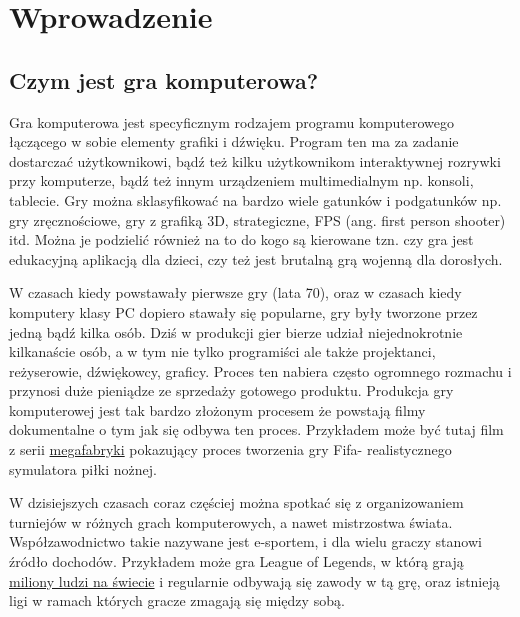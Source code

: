 \setcounter{secnumdepth}{3}
\renewcommand{\chaptername}{Rozdział}
\chapter{Wprowadzenie} 

\section{Czym jest gra komputerowa?}
\hspace{1cm} Gra komputerowa jest specyficznym rodzajem programu komputerowego łączącego w sobie elementy grafiki i dźwięku. Program ten ma za zadanie dostarczać użytkownikowi, bądź też kilku użytkownikom interaktywnej rozrywki przy komputerze, bądź też innym urządzeniem multimedialnym np. konsoli, tablecie. Gry można sklasyfikować na bardzo wiele gatunków i podgatunków np. gry zręcznościowe, gry z grafiką 3D, strategiczne, FPS (ang. first person shooter) itd. Można je podzielić również na to do kogo są kierowane tzn. czy gra jest edukacyjną aplikacją dla dzieci, czy też jest brutalną grą wojenną dla dorosłych.

W czasach kiedy powstawały pierwsze gry (lata 70), oraz w czasach kiedy komputery klasy PC dopiero stawały się popularne, gry były tworzone przez jedną bądź kilka osób. Dziś w produkcji gier bierze udział niejednokrotnie kilkanaście osób, a w tym nie tylko programiści ale także projektanci, reżyserowie, dźwiękowcy, graficy. 
Proces ten nabiera często ogromnego rozmachu i przynosi duże pieniądze ze sprzedaży gotowego produktu. Produkcja gry komputerowej jest tak bardzo złożonym procesem że powstają filmy dokumentalne o tym jak się odbywa ten proces. Przykładem może być tutaj film z serii \href{http://natgeotv.com/uk/megafactories/videos/ea-sports}{megafabryki} pokazujący proces tworzenia gry Fifa- realistycznego symulatora piłki nożnej. 

W dzisiejszych czasach coraz częściej można spotkać się z organizowaniem turniejów w różnych grach komputerowych, a nawet mistrzostwa świata. Współzawodnictwo takie nazywane jest e-sportem, i dla wielu graczy stanowi źródło dochodów. Przykładem może gra League of Legends, w którą grają  \href{http://gamezilla.komputerswiat.pl/newsy/2012/41/league-of-legends-w-liczbach-przerazajaco-wysokich-liczbach}{miliony ludzi na świecie} i regularnie odbywają się zawody w tą grę, oraz istnieją ligi w ramach których gracze zmagają się między sobą.


